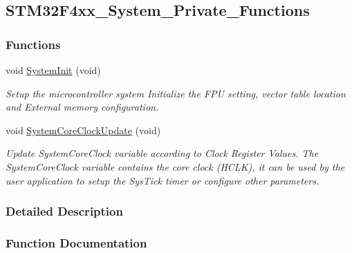 \hypertarget{group___s_t_m32_f4xx___system___private___functions}{}\subsection{S\+T\+M32\+F4xx\+\_\+\+System\+\_\+\+Private\+\_\+\+Functions}
\label{group___s_t_m32_f4xx___system___private___functions}
\subsubsection*{Functions}
\begin{DoxyCompactItemize}
\item 
void \hyperlink{group___s_t_m32_f4xx___system___private___functions_ga93f514700ccf00d08dbdcff7f1224eb2}{System\+Init} (void)
\begin{DoxyCompactList}\small\item\em Setup the microcontroller system Initialize the F\+PU setting, vector table location and External memory configuration. \end{DoxyCompactList}\item 
void \hyperlink{group___s_t_m32_f4xx___system___private___functions_gae0c36a9591fe6e9c45ecb21a794f0f0f}{System\+Core\+Clock\+Update} (void)
\begin{DoxyCompactList}\small\item\em Update System\+Core\+Clock variable according to Clock Register Values. The System\+Core\+Clock variable contains the core clock (H\+C\+LK), it can be used by the user application to setup the Sys\+Tick timer or configure other parameters. \end{DoxyCompactList}\end{DoxyCompactItemize}


\subsubsection{Detailed Description}


\subsubsection{Function Documentation}
\mbox{\label{group___s_t_m32_f4xx___system___private___functions_gae0c36a9591fe6e9c45ecb21a794f0f0f}} 

